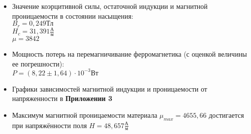 \begin{itemize}
    \item Значение коэрцитивной силы, остаточной индукции и магнитной проницаемости в состоянии насыщения: \\
    $B_r = 0,249 \text{Тл}$ \\
    $H_c = 31,391 \frac{\text{А}}{\text{м}}$ \\
    $\mu = 3842$

    \item Мощность потерь на перемагничивание ферромагнетика (с оценкой величины ее погрешности): \\
    $P = (8,22 \pm 1,64) \cdot 10^{-3} \text{Вт}$

    \item Графики зависимостей магнитной индукции и проницаемости от напряженности в \textbf{Приложении 3}

    \item  Максимум магнитной проницаемости материала $\mu_{max} = 4655,66$ достигается при напряжённости поля $H = 48,657 \frac{\text{А}}{\text{м}}$
\end{itemize}